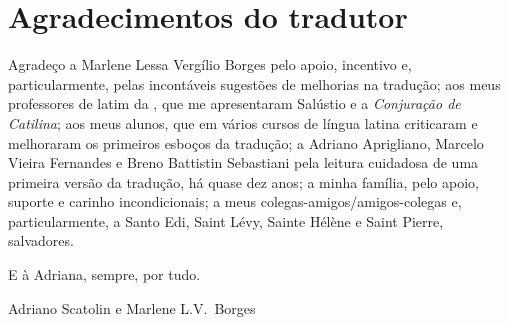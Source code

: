 \section{Agradecimentos do tradutor}

 
Agradeço a Marlene Lessa Vergílio Borges pelo apoio, incentivo e,
particularmente,  pelas  incontáveis sugestões de melhorias na tradução; aos
meus professores de latim da , que me apresentaram Salústio e a
\emph{Conjuração de Catilina}; aos meus alunos, que em vários
cursos de língua latina criticaram e melhoraram os primeiros esboços da tradução; a Adriano Aprigliano, Marcelo Vieira Fernandes e Breno Battistin Sebastiani pela leitura cuidadosa de uma primeira versão da tradução, há quase dez anos; a
minha família, pelo apoio, suporte e carinho incondicionais; a meus colegas-amigos/amigos-colegas e, particularmente, a Santo
Edi, Saint Lévy, Sainte Hélène e Saint Pierre,  salvadores.

E à Adriana, sempre, por tudo. 

\bigskip
\hfill Adriano Scatolin e Marlene L.V.~Borges


